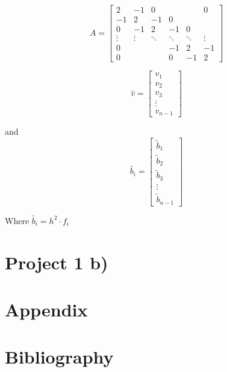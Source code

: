 \documentclass[]{article}
\begin{document}
\[A=\left[\begin{matrix}2 & -1 & 0 & & & 0\\-1 & 2 & -1 & 0 & &\\0 & -1 &2 & -1 & 0 &\\\vdots&\vdots & \ddots& \ddots&\ddots &\vdots\\0 & & & -1 & 2 & -1\\0 & & & 0 & -1 & 2\end{matrix}\right]\]

\[\hat{v}=\left[\begin{matrix}v_{1}\\v_{2}\\v_{3}\\ \vdots \\ v_{n-1}\end{matrix}\right]\]

and
\[\tilde{b_i}=\left[\begin{matrix}\tilde{b}_{1}\\\tilde{b}_{2}\\\tilde{b}_{3}\\ \vdots \\ \tilde{b}_{n-1}\end{matrix}\right]\]

Where $\tilde{b_i} = h^2 \cdot f_i$

\section*{Project 1 b)}\label{project-1-b}

\section*{Appendix}\label{appendix}

\section*{Bibliography}\label{bibliography}
\end{document}
